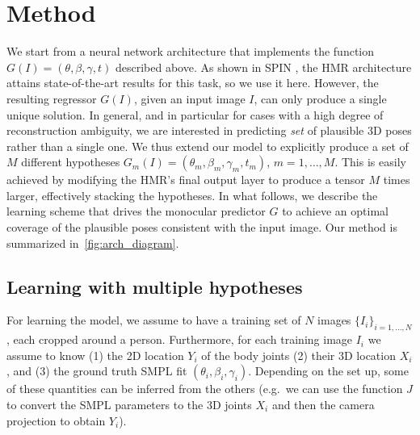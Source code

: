 \section{Method}\label{s:method}


We start from a neural network architecture that implements the function  $G(I) = (\theta, \beta, \gamma, t)$ described above.
As shown in SPIN \cite{kolotouros19learning}, the HMR \cite{kanazawa18learning} architecture attains state-of-the-art results for this task, so we use it here.
However, the resulting regressor $G(I)$, given an input image $I$, can only produce a single unique solution.
In general, and in particular for cases with a high degree of reconstruction ambiguity, we are interested in predicting  \emph{set} of plausible 3D poses rather than a single one.
%
We thus extend our model to explicitly produce a set of $M$ different hypotheses $G_m (I) = (\theta_m, \beta_m, \gamma_m, t_m)$, $m=1,\dots,M$.
This is easily achieved by modifying the HMR's final output layer to produce a tensor $M$ times larger, effectively stacking the hypotheses.
In what follows, we describe the learning scheme that drives the monocular predictor $G$ to achieve
an optimal coverage of the plausible poses consistent with the input image. Our method is summarized in~\cref{fig:arch_diagram}. 

\subsection{Learning with multiple hypotheses}

For learning the model, we assume to have a training set of $N$ images $\{I_i\}_{i =1,\dots,N}$, each cropped around a person.
Furthermore, for each training image $I_i$ we assume to know (1) the 2D location $Y_i$ of the body joints (2) their 3D location $X_i$, and (3) the ground truth SMPL fit $(\theta_i, \beta_i, \gamma_i)$.
Depending on the set up, some of these quantities can be inferred from the others (e.g.~we can use the function $J$ to convert the SMPL parameters to the 3D joints $X_i$ and then the camera projection to obtain $Y_i$).

